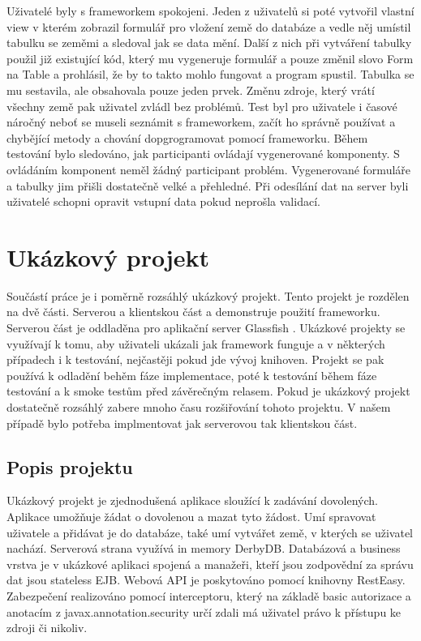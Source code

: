 Uživatelé byly s frameworkem spokojeni. Jeden z uživatelů si poté vytvořil vlastní view v kterém zobrazil formulář pro vložení země do databáze a vedle něj umístil tabulku se zeměmi a sledoval jak se data mění. Další z nich při vytváření tabulky použil již existující kód, který mu vygeneruje formulář a pouze změnil slovo Form na Table a prohlásil, že by to takto mohlo fungovat a program spustil. Tabulka se mu sestavila, ale obsahovala pouze jeden prvek. Změnu zdroje, který vrátí všechny země pak uživatel zvládl bez problémů. Test byl pro uživatele i časové náročný neboť se museli seznámit s frameworkem, začít ho správně používat a chybějící metody a chování dopgrogramovat pomocí frameworku. Během testování bylo sledováno, jak participanti ovládají vygenerované komponenty. S ovládáním komponent neměl žádný participant problém. Vygenerované formuláře a tabulky jim přišli dostatečně velké a přehledné. Při odesílání dat na server byli uživatelé schopni opravit vstupní data pokud neprošla validací. 

\section{Ukázkový projekt}
Součástí práce je i poměrně rozsáhlý ukázkový projekt. Tento projekt je rozdělen na dvě části. Serverou a klientskou část a demonstruje použití frameworku. Serverou část je oddladěna pro aplikační server Glassfish \cite{glassfish}. Ukázkové projekty se využívají k tomu, aby uživateli ukázali jak framework funguje a v některých případech i k testování, nejčastěji pokud jde vývoj knihoven. Projekt se pak používá k odladění behěm fáze implementace, poté k testování během fáze testování a k smoke testům před závěrečným relasem. Pokud je ukázkový projekt dostatečně rozsáhlý zabere mnoho času rozšiřování tohoto projektu. V našem případě bylo potřeba implmentovat jak serverovou tak klientskou část.
\subsection{Popis projektu}
Ukázkový projekt je zjednodušená aplikace sloužící k zadávání dovolených. Aplikace umožňuje žádat o dovolenou a mazat tyto žádost. Umí spravovat uživatele a přidávat je do databáze, také umí vytvářet země, v kterých se uživatel nachází. Serverová strana využívá in memory DerbyDB. Databázová a business vrstva je v ukázkové aplikaci spojená a manažeři, kteří jsou zodpovědní za správu dat jsou stateless EJB. Webová API je poskytováno pomocí knihovny RestEasy. Zabezpečení realizováno pomocí interceptoru, který na základě basic autorizace a anotacím z javax.annotation.security určí zdali má uživatel právo k přístupu ke zdroji či nikoliv.

